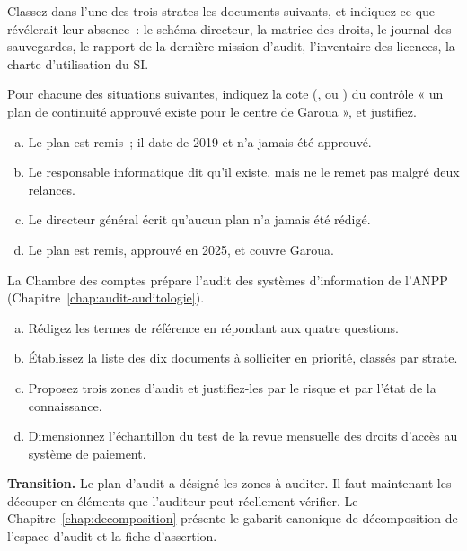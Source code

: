 \bigskip

\begin{boxexo}[title={\ding{45}\quad Exercice~6.1. Classer les documents \niveaubase}]
Classez dans l'une des trois strates les documents suivants, et indiquez ce
que révélerait leur absence~: le schéma directeur, la matrice des droits, le
journal des sauvegardes, le rapport de la dernière mission d'audit,
l'inventaire des licences, la charte d'utilisation du SI.
\end{boxexo}

\begin{boxexo}[title={\ding{45}\quad Exercice~6.2. Coter les absences \niveaumoyen}]
Pour chacune des situations suivantes, indiquez la cote (\OUI{}, \NON{} ou
\NEK{}) du contrôle « un plan de continuité approuvé existe pour le centre
de Garoua », et justifiez.
\begin{enumerate}[(a)]
    \item Le plan est remis~; il date de 2019 et n'a jamais été approuvé.
    \item Le responsable informatique dit qu'il existe, mais ne le remet pas
          malgré deux relances.
    \item Le directeur général écrit qu'aucun plan n'a jamais été rédigé.
    \item Le plan est remis, approuvé en 2025, et couvre Garoua.
\end{enumerate}
\end{boxexo}

\begin{boxexo}[title={\ding{45}\quad Exercice~6.3. Le plan d'audit de l'ANPP \niveauexpert}]
La Chambre des comptes prépare l'audit des systèmes d'information de l'ANPP
(Chapitre~\ref{chap:audit-auditologie}).
\begin{enumerate}[(a)]
    \item Rédigez les termes de référence en répondant aux quatre questions.
    \item Établissez la liste des dix documents à solliciter en priorité,
          classés par strate.
    \item Proposez trois zones d'audit et justifiez-les par le risque et par
          l'état de la connaissance.
    \item Dimensionnez l'échantillon du test de la revue mensuelle des droits
          d'accès au système de paiement.
\end{enumerate}
\end{boxexo}

\bigskip

\begin{boxinfo}
\textbf{Transition.} Le plan d'audit a désigné les zones à auditer. Il faut
maintenant les découper en éléments que l'auditeur peut réellement
vérifier. Le Chapitre~\ref{chap:decomposition} présente le gabarit canonique
de décomposition de l'espace d'audit et la fiche d'assertion.
\end{boxinfo}
